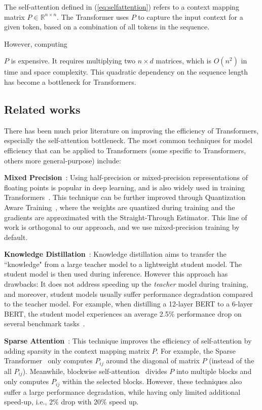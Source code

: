 The self-attention defined in (\ref{eq:selfattention}) refers to a context mapping matrix $P\in\mathbb{R}^{n\times n}$. The Transformer uses $P$ to capture the input context for a given token, based on a combination of all tokens in the sequence.

However, computing

$P$ is expensive. It requires multiplying two $n\times d$ matrices, which is $O(n^2)$ in time and space complexity. This quadratic dependency on the sequence length has become a bottleneck for Transformers.

\subsection{Related works}

There has been much prior literature on improving the efficiency of Transformers, especially the self-attention bottleneck. The most common techniques for model efficiency that can be applied to Transformers (some specific to Transformers, others more general-purpose) include:

\textbf{Mixed Precision}~\citep{micikevicius2017mixed}: Using half-precision or mixed-precision representations of floating points is popular in deep learning, and is also widely used in training Transformers~\citep{ott2019fairseq}. This technique can be further improved through Quantization Aware Training~\citep{jacob2018quantization,fan2020training}, where the weights are quantized during training and the gradients are approximated with the Straight-Through Estimator. This line of work is orthogonal to our approach, and we use mixed-precision training by default.

\textbf{Knowledge Distillation}~\citep{hinton2015distilling}: Knowledge distillation aims to transfer the ``knowledge" from a large teacher model to a lightweight student model. The student model is then used during inference. However this approach has drawbacks: It does not address speeding up the \textit{teacher} model during training, and moreover, student models usually suffer performance degradation compared to the teacher model. For example, when distilling a 12-layer BERT to a 6-layer BERT, the student model experiences an average 2.5\% performance drop on several benchmark tasks~\citep{sanh2019distilbert}.

\textbf{Sparse Attention}~\citep{child2019generating}: This technique improves the efficiency of self-attention by adding sparsity in the context mapping matrix $P$. For example, the Sparse Transformer~\citep{child2019generating} only computes $P_{ij}$ around the diagonal of matrix $P$ (instead of the all $P_{ij}$). Meanwhile, blockwise self-attention~\citep{qiu2019blockwise} divides $P$ into multiple blocks and only computes $P_{ij}$ within the selected blocks. However, these techniques also suffer a large performance degradation, while having only limited additional speed-up, i.e., 2\% drop with 20\% speed up. 

